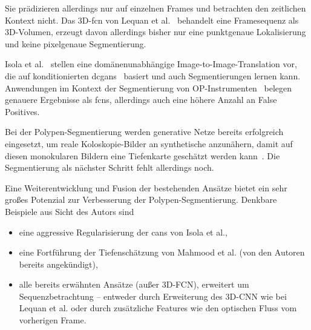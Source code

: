 Sie prädizieren allerdings nur auf einzelnen Frames und betrachten den zeitlichen Kontext nicht.
Das 3D-\gls{fcn} von Lequan et al.~\cite{Lequan.2017} behandelt eine Framesequenz als 3D-Volumen, erzeugt davon allerdings bisher nur eine punktgenaue Lokalisierung und keine pixelgenaue Segmentierung.

Isola et al.~\cite{Isola.2017} stellen eine domänenunabhängige Image-to-Image-Translation vor, die auf konditionierten \glspl{dcgan}~\cite{Radford.2016} basiert und auch Segmentierungen lernen kann.
Anwendungen im Kontext der Segmentierung von OP-Instrumenten~\cite{Zisimopoulos.2017} belegen genauere Ergebnisse als \glspl{fcn}, allerdings auch eine höhere Anzahl an False Positives.

Bei der Polypen-Segmentierung werden generative Netze bereits erfolgreich eingesetzt, um reale Koloskopie-Bilder an synthetische anzunähern, damit auf diesen monokularen Bildern eine Tiefenkarte geschätzt werden kann~\cite{Mahmood.20171129}.
Die Segmentierung als nächster Schritt fehlt allerdings noch.

Eine Weiterentwicklung und Fusion der bestehenden Ansätze bietet ein sehr großes Potenzial zur Verbesserung der Polypen-Segmentierung.
Denkbare Beispiele aus Sicht des Autors sind

\begin{itemize}
	\item eine aggressive Regularisierung der \glspl{can} von Isola et al.,
	\item eine Fortführung der Tiefenschätzung von Mahmood et al. (von den Autoren bereits angekündigt),
	\item alle bereits erwähnten Ansätze (außer 3D-FCN), erweitert um Sequenzbetrachtung -- entweder durch Erweiterung des 3D-CNN wie bei Lequan et al. oder durch zusätzliche Features wie den optischen Fluss vom vorherigen Frame.
\end{itemize}
